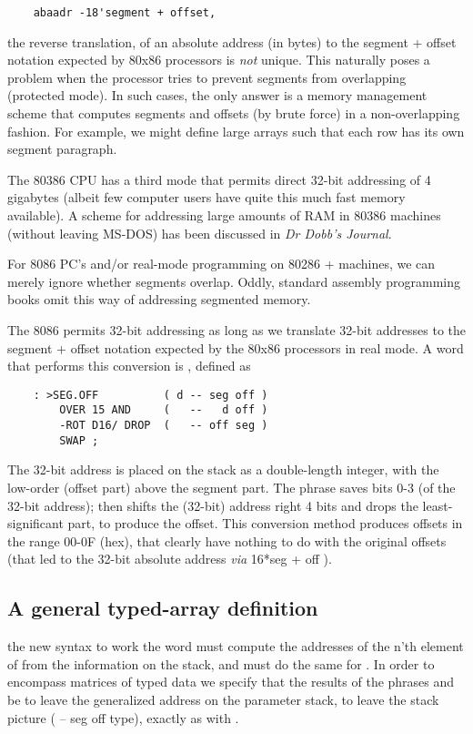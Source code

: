 \begin{lstlisting}
    abaadr -18'segment + offset,
\end{lstlisting}

the reverse translation, of an absolute address (in bytes) to the segment + offset notation expected by 80x86 processors is \textit{not} unique. This naturally poses a problem when the processor tries to prevent segments from overlapping (protected mode). In such cases, the only answer is a memory management scheme that computes segments and offsets (by brute force) in a non-overlapping fashion. For example, we might define large arrays such that each row has its own segment paragraph.

The 80386 CPU has a third mode that permits direct 32-bit addressing of 4 gigabytes (albeit few computer users have quite this much fast memory available). A scheme for addressing large amounts of RAM in 80386 machines (without leaving MS-DOS) has been discussed in \textit{Dr Dobb's Journal}.

For 8086 PC's and/or real-mode programming on 80286 + machines, we can merely ignore whether segments overlap. Oddly, standard assembly programming books omit this way of addressing segmented memory.

The 8086 permits 32-bit addressing as long as we translate 32-bit addresses to the segment + offset notation expected by the 80x86 processors in real mode. A word that performs this conversion is , defined as

\begin{lstlisting}
    : >SEG.OFF          ( d -- seg off )
        OVER 15 AND     (   --   d off )
        -ROT D16/ DROP  (   -- off seg )
        SWAP ;
\end{lstlisting}

The 32-bit address is placed on the stack as a double-length integer, with the low-order (\ie offset part) above the segment part. The phrase  saves bits 0-3 (of the 32-bit address);  then shifts the (32-bit) address right 4 bits and drops the least-significant part, to produce the offset. This conversion method produces offsets in the range 00-0F (hex), that clearly have nothing to do with the original offsets (that led to the 32-bit absolute address \textit{via} 16*seg + off ).

\subsection{A general typed-array definition}
 the new syntax to work the word \bc{\}} must compute the addresses of the n'th element of  from the information on the stack, and \bc{\}\}} must do the same for . In order to encompass matrices of typed data we specify that the results of the phrases and  be to leave the generalized address on the parameter stack, \ie to leave the stack picture ( -- seg off type), exactly as with .

